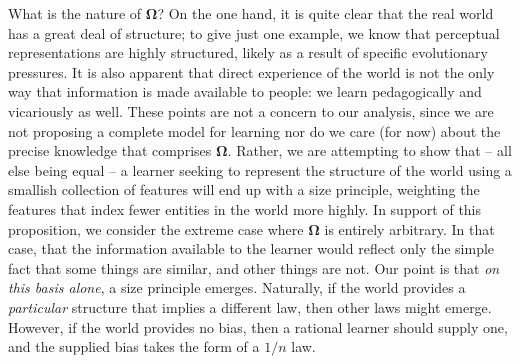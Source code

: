 \documentclass{apa}
\begin{document}
What is the nature of $\mathbf{\Omega}$? On the one hand, it is quite clear that the real world has a great deal of structure; to give just one example, we know that perceptual representations are highly structured, likely as a result of specific evolutionary pressures.  It is also apparent that direct experience of the world is not the only way that information is made available to people: we learn pedagogically and vicariously as well. These points are not a concern to our analysis, since we are not proposing a complete model for learning nor do we care (for now) about the precise knowledge that comprises $\mathbf{\Omega}$. Rather, we are attempting to show that -- all else being equal -- a learner seeking to represent the structure of the world using a smallish collection of features will end up with a size principle, weighting the features that index fewer entities in the world more highly. In support of this proposition, we consider the extreme case where $\mathbf{\Omega}$ is entirely arbitrary. In that case, that the information available to the learner would reflect only the simple fact that some things are similar, and other things are not. Our point is that {\it on this basis alone}, a size principle emerges. Naturally, if the world provides a {\it particular} structure that implies a different law, then other laws might emerge. However, if the world provides no bias, then a rational learner should supply one, and the supplied bias takes the form of a $1/n$ law.
\end{document}
